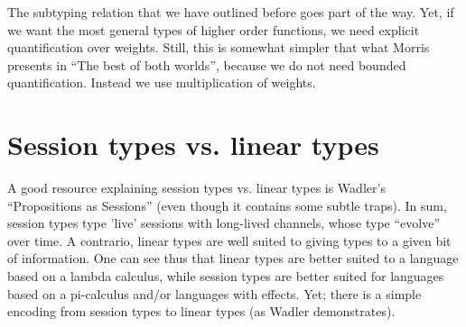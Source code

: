 \documentclass[11pt]{article}
\begin{document}
The subtyping relation that we have outlined before goes part of the
way.  Yet, if we want the most general types of higher order
functions, we need explicit quantification over weights. Still, this
is somewhat simpler that what Morris presents in ``The best of both
worlds'', because we do not need bounded quantification. Instead we
use multiplication of weights.

\section{Session types vs. linear types}

A good resource explaining session types vs. linear types is Wadler's
``Propositions as Sessions'' (even though it contains some subtle
traps). In sum, session types type 'live' sessions with long-lived
channels, whose type ``evolve'' over time. A contrario, linear types
are well suited to giving types to a given bit of information. One can
see thus that linear types are better suited to a language based on a
lambda calculus, while session types are better suited for languages
based on a pi-calculus and/or languages with effects. Yet; there is a
simple encoding from session types to linear types (as Wadler
demonstrates).
\end{document}
